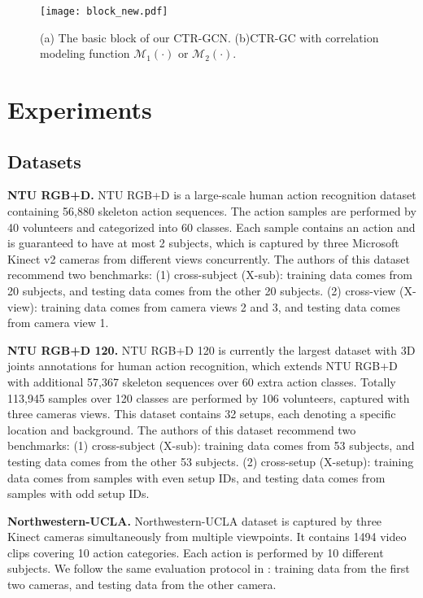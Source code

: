 \documentclass[10pt,twocolumn,letterpaper]{article}
\begin{document}
\begin{figure}[t]
	\centering
	\texttt{[image: block\_new.pdf]} \caption{(a) The basic block of our CTR-GCN. (b)CTR-GC with correlation modeling function $\mathcal{M}_1(\cdot)$ or $\mathcal{M}_2(\cdot)$.}
	\label{fig:gc_instance}
	\vspace{-0.5cm}
\end{figure}


\section{Experiments}

\subsection{Datasets}
\noindent \textbf{NTU RGB+D.} NTU RGB+D \cite{shahroudy2016ntu} is a large-scale human action recognition dataset containing 56,880 skeleton action sequences. The action samples are performed by 40 volunteers and categorized into 60 classes. Each sample contains an action and is guaranteed to have at most 2 subjects, which is captured by three Microsoft Kinect v2 cameras from different views concurrently. The authors of this dataset recommend two benchmarks: (1) cross-subject (X-sub): training data comes from 20 subjects, and testing data comes from the other 20 subjects. (2) cross-view (X-view): training data comes from camera views 2 and 3, and testing data comes from camera view 1.

\noindent \textbf{NTU RGB+D 120.} NTU RGB+D 120 \cite{liu2019ntu} is currently the largest dataset with 3D joints annotations for human action recognition, which extends NTU RGB+D with additional 57,367 skeleton sequences over 60 extra action classes. Totally 113,945 samples over 120 classes are performed by 106 volunteers, captured with three cameras views. This dataset contains 32 setups, each denoting a specific location and background. The authors of this dataset recommend two benchmarks: (1) cross-subject (X-sub): training data comes from 53 subjects, and testing data comes from the other 53 subjects. (2) cross-setup (X-setup): training data comes from samples with even setup IDs, and testing data comes from samples with odd setup IDs.

\noindent \textbf{Northwestern-UCLA.} Northwestern-UCLA dataset \cite{wang2014cross} is captured by three Kinect cameras simultaneously from multiple viewpoints. It contains 1494 video clips covering 10 action categories. Each action is performed by 10 different subjects. We follow the same evaluation protocol in \cite{wang2014cross}: training data from the first two cameras, and testing data from the other camera.
\end{document}

